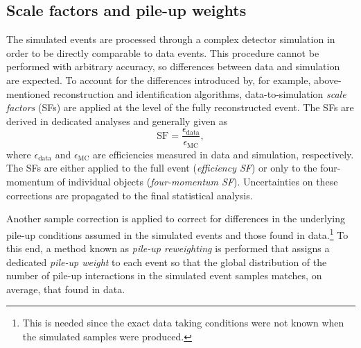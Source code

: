 \subsection{Scale factors and pile-up weights}
The simulated events are processed through a complex detector simulation in order to be directly comparable to data events. 
This procedure cannot be performed with arbitrary accuracy, so differences between data and simulation are expected.
To account for the differences introduced by, for example, above-mentioned reconstruction and identification algorithms, data-to-simulation \emph{scale factors} (SFs) are applied at the level of the fully reconstructed event. The SFs are derived in dedicated analyses and generally given as
\begin{equation}
    \text{SF} = \frac{\epsilon_\text{data}}{\epsilon_{\text{MC}}},
\end{equation}
where $\epsilon_\text{data}$ and $\epsilon_\text{MC}$ are efficiencies measured in data and simulation, respectively.
The SFs are either applied to the full event (\emph{efficiency SF}) or only to the four-momentum of individual objects (\emph{four-momentum SF}). 
Uncertainties on these corrections are propagated to the final statistical analysis.

Another sample correction is applied to correct for differences in the underlying pile-up conditions assumed in the simulated events and those found in data.\footnote{This is needed since the exact data taking conditions were not known when the simulated samples were produced.}
To this end, a method known as \emph{pile-up reweighting} is performed that assigns a dedicated \emph{pile-up weight} to each event so that the global distribution of the number of pile-up interactions in the simulated event samples matches, on average, that found in data. 









